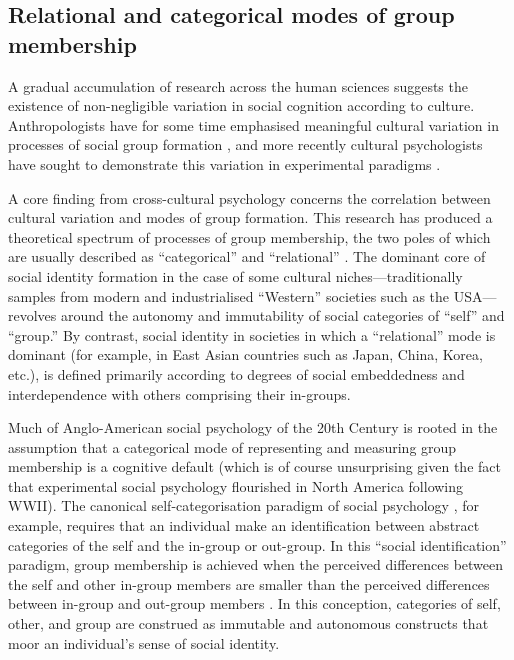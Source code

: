 \begin{CJK}{UTF8}{gbsn}


\subsection{Relational and categorical modes of group membership}

A gradual accumulation of research across the human sciences suggests the existence of non-negligible variation in social cognition according to culture.  Anthropologists have for some time emphasised meaningful cultural variation in processes of social group formation \citep{Strodtbeck1961,Kluckhohn1961,Mead1967,Fei1992}, and more recently cultural psychologists have sought to demonstrate this variation in experimental paradigms \citep{Markus1991,Nisbett2001}.

A core finding from cross-cultural psychology concerns the correlation between cultural variation and modes of group formation.  This research has produced a theoretical spectrum of processes of group membership, the two poles of which are usually described as ``categorical'' and ``relational'' \citep{Hofstede1980,Brewer2007}.  The dominant core of social identity formation in the case of some cultural niches---traditionally samples from modern and industrialised ``Western'' societies such as the USA---revolves around the autonomy and immutability of social categories of ``self'' and ``group.''  By contrast, social identity in societies in which a ``relational'' mode is dominant (for example, in East Asian countries such as Japan, China, Korea, etc.), is defined primarily according to degrees of social embeddedness and interdependence with others comprising their in-groups\citep{Leung2012}.

Much of Anglo-American social psychology of the 20th Century is rooted in the assumption that a categorical mode of representing and measuring group membership is a cognitive default (which is of course unsurprising given the fact that experimental social psychology flourished in North America following WWII).  The canonical self-categorisation paradigm of social psychology \citep{Turner1987}, for example, requires that an individual make an identification between abstract categories of the self and the in-group or out-group. In this ``social identification'' paradigm, group membership is achieved when the perceived differences between the self and other in-group members are smaller than the perceived differences between in-group and out-group members \citep{Yuki2014}. In this conception, categories of self, other, and group are construed as immutable and autonomous constructs that moor an individual's sense of social identity.


\end{CJK}
